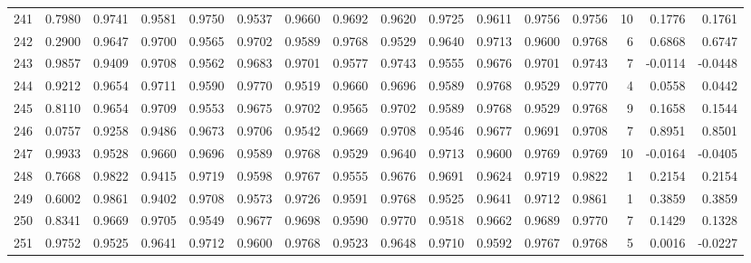\begin{tabular}{lrrrrrrrrrrrrrrr}
241 &      0.7980 &  0.9741 &  0.9581 &  0.9750 &  0.9537 &  0.9660 &  0.9692 &  0.9620 &  0.9725 &  0.9611 &   0.9756 &     0.9756 &     10 &                    0.1776 &                     0.1761 \\
242 &      0.2900 &  0.9647 &  0.9700 &  0.9565 &  0.9702 &  0.9589 &  0.9768 &  0.9529 &  0.9640 &  0.9713 &   0.9600 &     0.9768 &      6 &                    0.6868 &                     0.6747 \\
243 &      0.9857 &  0.9409 &  0.9708 &  0.9562 &  0.9683 &  0.9701 &  0.9577 &  0.9743 &  0.9555 &  0.9676 &   0.9701 &     0.9743 &      7 &                   -0.0114 &                    -0.0448 \\
244 &      0.9212 &  0.9654 &  0.9711 &  0.9590 &  0.9770 &  0.9519 &  0.9660 &  0.9696 &  0.9589 &  0.9768 &   0.9529 &     0.9770 &      4 &                    0.0558 &                     0.0442 \\
245 &      0.8110 &  0.9654 &  0.9709 &  0.9553 &  0.9675 &  0.9702 &  0.9565 &  0.9702 &  0.9589 &  0.9768 &   0.9529 &     0.9768 &      9 &                    0.1658 &                     0.1544 \\
246 &      0.0757 &  0.9258 &  0.9486 &  0.9673 &  0.9706 &  0.9542 &  0.9669 &  0.9708 &  0.9546 &  0.9677 &   0.9691 &     0.9708 &      7 &                    0.8951 &                     0.8501 \\
247 &      0.9933 &  0.9528 &  0.9660 &  0.9696 &  0.9589 &  0.9768 &  0.9529 &  0.9640 &  0.9713 &  0.9600 &   0.9769 &     0.9769 &     10 &                   -0.0164 &                    -0.0405 \\
248 &      0.7668 &  0.9822 &  0.9415 &  0.9719 &  0.9598 &  0.9767 &  0.9555 &  0.9676 &  0.9691 &  0.9624 &   0.9719 &     0.9822 &      1 &                    0.2154 &                     0.2154 \\
249 &      0.6002 &  0.9861 &  0.9402 &  0.9708 &  0.9573 &  0.9726 &  0.9591 &  0.9768 &  0.9525 &  0.9641 &   0.9712 &     0.9861 &      1 &                    0.3859 &                     0.3859 \\
250 &      0.8341 &  0.9669 &  0.9705 &  0.9549 &  0.9677 &  0.9698 &  0.9590 &  0.9770 &  0.9518 &  0.9662 &   0.9689 &     0.9770 &      7 &                    0.1429 &                     0.1328 \\
251 &      0.9752 &  0.9525 &  0.9641 &  0.9712 &  0.9600 &  0.9768 &  0.9523 &  0.9648 &  0.9710 &  0.9592 &   0.9767 &     0.9768 &      5 &                    0.0016 &                    -0.0227 \\

\end{tabular}
